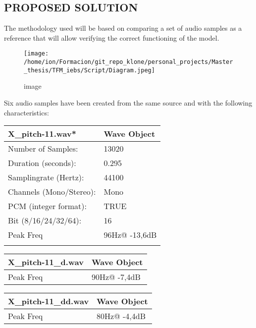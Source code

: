 \documentclass[
]{article}
\begin{document}
\newpage

\hypertarget{proposed-solution}{%
\subsection{PROPOSED SOLUTION}\label{proposed-solution}}

\vspace{15pt}

The methodology used will be based on comparing a set of audio samples
as a reference that will allow verifying the correct functioning of the
model.

\vspace{60pt}

\begin{figure}
\centering
\texttt{[image: /home/ion/Formacion/git\_repo\_klone/personal\_projects/Master\_thesis/TFM\_iebs/Script/Diagram.jpeg]}
\caption{image}
\end{figure}

\newpage

Six audio samples have been created from the same source and with the
following characteristics:

\begin{longtable}[]{@{}ll@{}}
\toprule
X\_pitch-11.wav* & Wave Object \\
\midrule
\endhead
Number of Samples: & 13020 \\
Duration (seconds): & 0.295 \\
Samplingrate (Hertz): & 44100 \\
Channels (Mono/Stereo): & Mono \\
PCM (integer format): & TRUE \\
Bit (8/16/24/32/64): & 16 \\
Peak Freq & 96Hz@ -13,6dB \\
& \\
\bottomrule
\end{longtable}

\begin{longtable}[]{@{}ll@{}}
\toprule
X\_pitch-11\_d.wav & Wave Object \\
\midrule
\endhead
Peak Freq & 90Hz@ -7,4dB \\
\bottomrule
\end{longtable}

\begin{longtable}[]{@{}ll@{}}
\toprule
X\_pitch-11\_dd.wav & Wave Object \\
\midrule
\endhead
Peak Freq & 80Hz@ -4,4dB \\
\bottomrule
\end{longtable}
\end{document}
